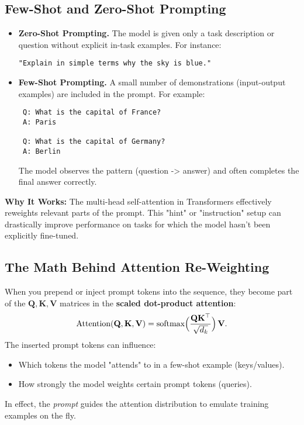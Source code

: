 \subsection{Few-Shot and Zero-Shot Prompting}
\begin{itemize}
    \item \textbf{Zero-Shot Prompting.} The model is given only a task description or question without explicit in-task examples. For instance:
\begin{verbatim}
"Explain in simple terms why the sky is blue."
\end{verbatim}
    \item \textbf{Few-Shot Prompting.} A small number of demonstrations (input-output examples) are included in the prompt. For example:
\begin{verbatim}
 Q: What is the capital of France? 
 A: Paris

 Q: What is the capital of Germany?
 A: Berlin
\end{verbatim}
  The model observes the pattern (question -> answer) and often completes the final answer correctly.
\end{itemize}

\noindent
\textbf{Why It Works:} The multi-head self-attention in Transformers effectively reweights relevant parts of the prompt. This "hint" or "instruction" setup can drastically improve performance on tasks for which the model hasn't been explicitly fine-tuned.

\subsection{The Math Behind Attention Re-Weighting}
\noindent
When you prepend or inject prompt tokens into the sequence, they become part of the \(\mathbf{Q}, \mathbf{K}, \mathbf{V}\) matrices in the \textbf{scaled dot-product attention}:
\[
\text{Attention}(\mathbf{Q}, \mathbf{K}, \mathbf{V}) = \text{softmax}\Bigl(\frac{\mathbf{Q}\mathbf{K}^\top}{\sqrt{d_k}}\Bigr)\,\mathbf{V}.
\]
The inserted prompt tokens can influence:
\begin{itemize}
    \item Which tokens the model "attends" to in a few-shot example (keys/values).
    \item How strongly the model weights certain prompt tokens (queries).
\end{itemize}
In effect, the \emph{prompt} guides the attention distribution to emulate training examples on the fly.

